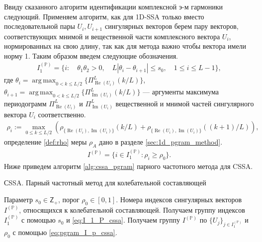 \documentclass[specialist,
               substylefile = spbu.rtx,
               subf,href,colorlinks=true, 12pt]{disser}
\def\RE{\mathop{\mathrm{Re}}}
\def\argmax{\mathop{\mathrm{argmax}}}
\def\IM{\mathop{\mathrm{Im}}}
\def\argmax{\mathop{\mathrm{arg\,max}}}
\begin{document}
Ввиду сказанного алгоритм идентификации комплексной э-м гармоники следующий. Применяем алгоритм, как для 1D-SSA только вместо последовательной пары $U_i, U_{i+1}$ сингулярных векторов берем пару векторов, соответствующих мнимой и вещественной части  комплексного вектора $U_i$, нормированных на свою длину, так как для метода важно чтобы вектора имели норму 1. 
Таким образом введем следующие обозначения.  
\begin{gather} \label{eq:I_1_P_cssa}
I_1^{(\mathbb{P})} = \{ i: \quad \theta_1 \theta_2 >0, \quad L |\theta_i - \theta_{i+1}| \leqslant s_0, \quad 1 \leqslant i \leqslant L -1  \},
\end{gather}
где $\theta_i = \argmax_{0 < k \leqslant L/2} \{\Pi_{\RE(U_i)}^L(k/L)\}$, $\theta_{i+1} = \argmax_{0 < k \leqslant L/2} \{\Pi_{\IM(U_i)}^L(k/L)\}$ --- аргументы максимума периодограмм $\Pi_{\RE(U_i)}^L$ и $\Pi_{\IM(U_i)}^L$ вещественной и мнимой частей сингулярного вектора $U_i$ соответственно.
\begin{gather*}
\rho_{i} := \max_{0 \leqslant k \leqslant L/2}{\left(\rho_{\{\RE(U_i),\IM(U_i)\}}(k/L) + \rho_{\{\RE(U_i),\IM(U_i)\}}((k+1)/L)\right)},
\end{gather*}
определение \ref{def:rho} меры $\rho_A$ дано в разделе \ref{sec:1d_pgram_method}.
\begin{gather} \label{eq:pgram_I_p_cssa}
I^{(\mathbb{P})} = \{ i \in I_1^{(\mathbb{P})}: \rho_{i} \geqslant\rho_0 \}.
\end{gather}
Ниже приведем алгоритм \ref{alg:cssa_pgram} парного частотного метода для CSSA.
\begin{algorithm}[!hhh]
\caption{СSSA. Парный частотный метод для колебательной составляющей}
\label{alg:cssa_pgram}
\begin{algorithmic}[1]
\REQUIRE Параметр $s_0 \in \mathsf{Z}_{+}$, порог $\rho_0 \in [0,1]$.
\ENSURE Номера индексов сингулярных векторов $I^{(\mathbb{P})}$, относящихся к колебательной составляющей.
\STATE  Получаем группу индексов $I_1^{(\mathbb{P})}$ с помощью $s_0$ и \eqref{eq:I_1_P_cssa}.
\STATE Получаем группу $I^{(\mathbb{P})}$ по $\{U_j\}_{j \in I_1^{(\mathbb{P})}}$ и $\rho_0$ с помощью \eqref{eq:pgram_I_p_cssa}.
\end{algorithmic}
\end{algorithm}


\newpage
\end{document}
